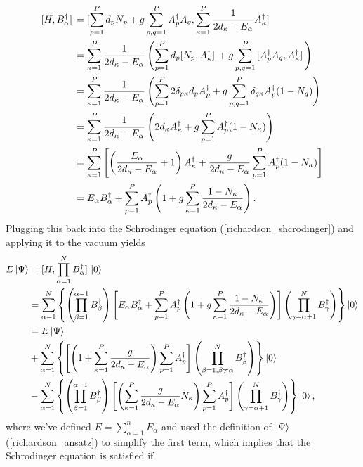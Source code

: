 \documentclass[10pt]{article}
\begin{document}
\begin{align}
\comm*{H}{B^\dagger_\alpha}
&=
\comm*{\sum_{p=1}^Pd_pN_p+g\sum_{p,q=1}^PA^\dagger_pA_q}{\sum_{\kappa=1}^P\frac{1}{2d_\kappa-E_\alpha}A^\dagger_\kappa}
\\
&=
\sum_{\kappa=1}^P
\frac{1}{2d_\kappa-E_\alpha}
\left(
\sum_{p=1}^Pd_p\comm*{N_p}{A^\dagger_\kappa}
+
g\sum_{p,q=1}^P\comm*{A^\dagger_pA_q}{A^\dagger_\kappa}
\right)
\\
&=
\sum_{\kappa=1}^P
\frac{1}{2d_\kappa-E_\alpha}
\left(
\sum_{p=1}^P2\delta_{p\kappa}d_pA^\dagger_p
+
g\sum_{p,q=1}^P\delta_{q\kappa}A^\dagger_p(1-N_q)
\right)
\\
&=
\sum_{\kappa=1}^P
\frac{1}{2d_\kappa-E_\alpha}
\left(
2d_\kappa A^\dagger_\kappa
+
g\sum_{p=1}^PA^\dagger_p(1-N_\kappa)
\right)
\\
&=
\sum_{\kappa=1}^P
\left[
\left(\frac{E_\alpha}{2d_\kappa-E_\alpha}+1\right)
A^\dagger_\kappa
+
\frac{g}{2d_\kappa-E_\alpha}
\sum_{p=1}^PA^\dagger_p(1-N_\kappa)
\right]
\\
&=
E_\alpha B^\dagger_\alpha+\sum_{p=1}^PA^\dagger_p
\left(1+g\sum_{\kappa=1}^P\frac{1-N_\kappa}{2d_\kappa-E_\alpha}\right).
\end{align}
Plugging this back into the Schrodinger equation (\ref{richardson_shcrodinger}) and applying it to the vacuum yields
\begin{align}
E\ket{\Psi}
&=
\comm*{H}{\prod_{\alpha=1}^N B^\dagger_{\alpha}}\ket{0}
\nonumber
\\
&=
\sum_{\alpha=1}^N
\left\{
\left(\prod_{\beta=1}^{\alpha-1}B^\dagger_\beta\right)
\left[E_\alpha B^\dagger_\alpha+\sum_{p=1}^PA^\dagger_p
\left(1+g\sum_{\kappa=1}^P\frac{1-N_\kappa}{2d_\kappa-E_\alpha}\right)\right]
\left(\prod_{\gamma=\alpha+1}^NB^\dagger_\gamma\right)
\right\}
\ket{0}
\nonumber
\\
&=
E\ket{\Psi}
\nonumber
\\
&+
\sum_{\alpha=1}^N
\left\{
\left[
\left(1+\sum_{\kappa=1}^P\frac{g}{2d_\kappa-E_\alpha}\right)\sum_{p=1}^PA^\dagger_p
\right]
\left(\prod_{\beta=1,\beta\neq\alpha}^NB^\dagger_\beta\right)
\right\}
\ket{0}
\nonumber
\\
&-
\sum_{\alpha=1}^N
\left\{
\left(\prod_{\beta=1}^{\alpha-1}B^\dagger_\beta\right)
\left[
\left(
\sum_{\kappa=1}^P\frac{g}{2d_\kappa-E_\alpha}N_\kappa
\right)
\sum_{p=1}^PA^\dagger_p
\right]
\left(\prod_{\gamma=\alpha+1}^NB^\dagger_\gamma\right)
\right\}
\ket{0}
,\end{align}
where we've defined $E=\sum_{\alpha=1}^nE_\alpha$ and used the definition of $\ket{\Psi}$ (\ref{richardson_ansatz}) to simplify the first term, which implies that the Schrodinger equation is satisfied if
\end{document}
